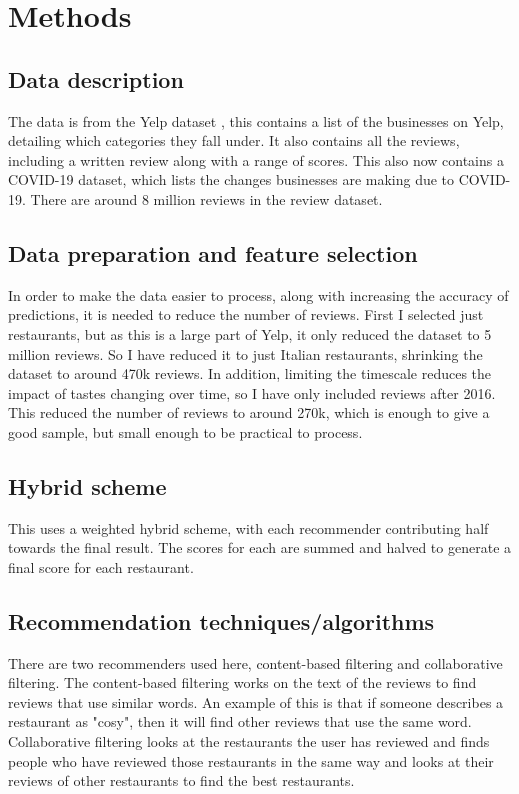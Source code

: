 \documentclass[conference]{IEEEtran}
\begin{document}
\section{Methods}

\subsection{Data description}

The data is from the Yelp dataset \cite{b1}, this contains a list of the businesses on Yelp, detailing which categories they fall under. It also contains all the reviews, including a written review along with a range of scores. This also now contains a COVID-19 dataset, which lists the changes businesses are making due to COVID-19. There are around 8 million reviews in the review dataset.

\subsection{Data preparation and feature selection}

In order to make the data easier to process, along with increasing the accuracy of predictions, it is needed to reduce the number of reviews. First I selected just restaurants, but as this is a large part of Yelp, it only reduced the dataset to 5 million reviews. So I have reduced it to just Italian restaurants, shrinking the dataset to around 470k reviews. In addition, limiting the timescale reduces the impact of tastes changing over time, so I have only included reviews after 2016. This reduced the number of reviews to around 270k, which is enough to give a good sample, but small enough to be practical to process.

\subsection{Hybrid scheme}

This uses a weighted hybrid scheme, with each recommender contributing half towards the final result. The scores for each are summed and halved to generate a final score for each restaurant.

\subsection{Recommendation techniques/algorithms}

There are two recommenders used here, content-based filtering and collaborative filtering. The content-based filtering works on the text of the reviews to find reviews that use similar words. An example of this is that if someone describes a restaurant as "cosy", then it will find other reviews that use the same word. Collaborative filtering looks at the restaurants the user has reviewed and finds people who have reviewed those restaurants in the same way and looks at their reviews of other restaurants to find the best restaurants.
\end{document}
